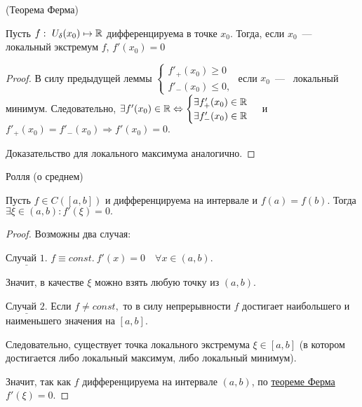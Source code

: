 \begin{theorem}
	\hypertarget{thrm5.9}{(Теорема Ферма)} Пусть $f: \ U_{\delta}(x_{0}) \mapsto \mathbb{R}$ дифференцируема в точке $x_{0}$. Тогда, если $x_{0}$~---~ локальный экстремум $f$, $f'(x_{0}) = 0$
\end{theorem}
\begin{proof}
	В силу предыдущей леммы $ \begin{cases}
		f'_{+}(x_{0}) \geq 0 \\
		f'_{-}(x_{0}) \leq 0,
	\end{cases}$
	если $x_{0}$~---~ локальный минимум. Следовательно, $\exists f'(x_{0}) \in \mathbb{R} \Leftrightarrow \begin{cases}
		\exists f'_{+}(x_{0}) \in \mathbb{R} \\
		\exists f'_{-}(x_{0}) \in \mathbb{R}
	\end{cases}$
	и $f'_{+}(x_{0}) = f'_{-}(x_{0}) \Rightarrow f'(x_{0}) = 0.$
	
	Доказательство для локального максимума аналогично.
\end{proof}

\begin{theorem}
	\hypertarget{thrm5.10}{Ролля (о среднем)} Пусть $f \in C([a,b])$ и дифференцируема на интервале и $f (a) = f (b)$. Тогда $\exists \xi \in (a, b): f'(\xi) = 0.$
\end{theorem}
\begin{proof}
	Возможны два случая:
	
	$\underline{\textrm{Случай 1.}}$ $f \equiv const. \ f'(x) = 0 \quad \forall x\in (a, b)$.
	
	Значит, в качестве $\xi$ можно взять любую точку из $(a, b)$.
	
	$\underline{\textrm{Случай 2.}}$ Если $f \neq const,$ то в силу непрерывности $f$ достигает наибольшего и наименьшего значения на $[a, b].$
	
	Следовательно, существует точка локального экстремума $\xi \in [a,b]$ (в котором достигается либо локальный максимум, либо локальный минимум).
	
	Значит, так как $f$ дифференцируема на интервале $(a, b)$, по \hyperlink{thrm6.1}{теореме Ферма} $f'(\xi) = 0$.
\end{proof}

